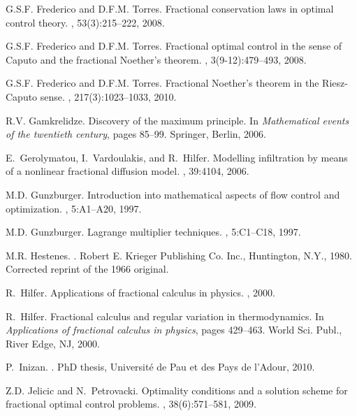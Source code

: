 \documentclass[english,11pt,reqno]{smfart}
\begin{document}
\begin{thebibliography}{10}
G.S.F. Frederico and D.F.M. Torres.
\newblock Fractional conservation laws in optimal control theory.
, 53(3):215--222, 2008.

G.S.F. Frederico and D.F.M. Torres.
\newblock Fractional optimal control in the sense of {C}aputo and the
  fractional {N}oether's theorem.
, 3(9-12):479--493, 2008.

G.S.F. Frederico and D.F.M. Torres.
\newblock Fractional {N}oether's theorem in the {R}iesz-{C}aputo sense.
, 217(3):1023--1033, 2010.

R.V. Gamkrelidze.
\newblock Discovery of the maximum principle.
\newblock In {\em Mathematical events of the twentieth century}, pages 85--99.
  Springer, Berlin, 2006.

E.~Gerolymatou, I.~Vardoulakis, and R.~Hilfer.
\newblock Modelling infiltration by means of a nonlinear fractional diffusion
  model.
, 39:4104, 2006.

M.D. Gunzburger.
\newblock Introduction into mathematical aspects of flow control and
  optimization.
,
  5:A1--A20, 1997.

M.D. Gunzburger.
\newblock Lagrange multiplier techniques.
,
  5:C1--C18, 1997.

M.R. Hestenes.
.
\newblock Robert E. Krieger Publishing Co. Inc., Huntington, N.Y., 1980.
\newblock Corrected reprint of the 1966 original.

R.~Hilfer.
\newblock Applications of fractional calculus in physics.
, 2000.

R.~Hilfer.
\newblock Fractional calculus and regular variation in thermodynamics.
\newblock In {\em Applications of fractional calculus in physics}, pages
  429--463. World Sci. Publ., River Edge, NJ, 2000.

P.~Inizan.
.
\newblock PhD thesis, Universit\'e de Pau et des Pays de l'Adour, 2010.

Z.D. Jelicic and N.~Petrovacki.
\newblock Optimality conditions and a solution scheme for fractional optimal
  control problems.
, 38(6):571--581, 2009.


\end{thebibliography}
\end{document}
